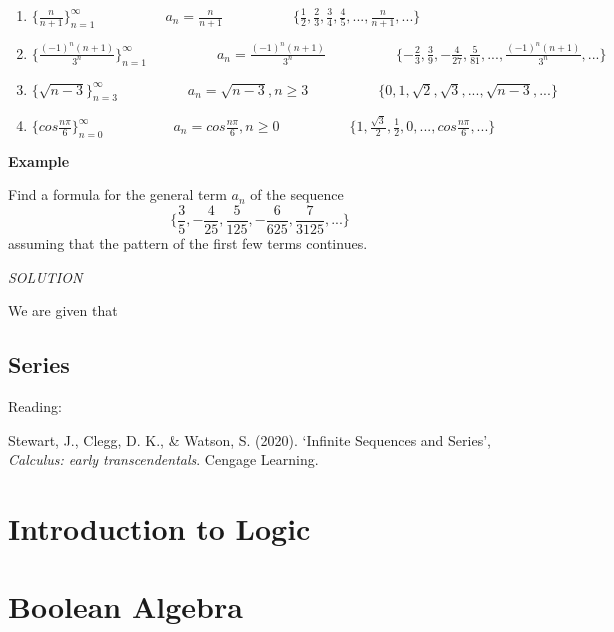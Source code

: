 \documentclass[]{book}
\begin{document}
\begin{enumerate}
\def\labelenumi{\alph{enumi})}
\item
  \(\{\frac{n}{n+1}\}_{n=1}^{\infty} \hspace{5em} a_{n} = \frac{n}{n+1}\hspace{5em}\{\frac{1}{2},\frac{2}{3}, \frac{3}{4}, \frac{4}{5},..., \frac{n}{n+1},... \}\)
\item
  \(\{\frac{(-1)^n(n+1)}{3^{n}}\}_{n=1}^{\infty} \hspace{5em} a_{n} = \frac{(-1)^n(n+1)}{3^{n}}\hspace{5em}\{-\frac{2}{3},\frac{3}{9}, -\frac{4}{27}, \frac{5}{81},..., \frac{(-1)^n(n+1)}{3^{n}},... \}\)
\item
  \(\{\sqrt{n-3}\}_{n=3}^{\infty} \hspace{5em} a_{n} = \sqrt{n-3}, n\geq3\hspace{5em}\{0,1,\sqrt{2}, \sqrt{3},..., \sqrt{n-3},...\}\)
\item
  \(\{cos\frac{n\pi}{6}\}_{n=0}^{\infty} \hspace{5em} a_{n} = cos\frac{n\pi}{6}, n\geq 0 \hspace{5em}\{1, \frac{\sqrt{3}}{2},\frac{1}{2}, 0,...,cos\frac{n\pi}{6},...\}\)
\end{enumerate}

\textbf{Example}

Find a formula for the general term \(a_{n}\) of the sequence
\[\{\frac{3}{5},-\frac{4}{25}, \frac{5}{125}, -\frac{6}{625}, \frac{7}{3125},...\}\]
assuming that the pattern of the first few terms continues.

\emph{SOLUTION}

We are given that

\hypertarget{series}{%
\section{Series}\label{series}}

Reading:

Stewart, J., Clegg, D. K., \& Watson, S. (2020). `Infinite Sequences and Series', \emph{Calculus: early transcendentals}. Cengage Learning.

\hypertarget{introduction-to-logic}{%
\chapter{Introduction to Logic}\label{introduction-to-logic}}

\hypertarget{boolean-algebra}{%
\chapter{Boolean Algebra}\label{boolean-algebra}}
\end{document}
